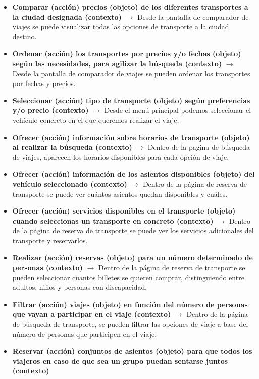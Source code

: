 \begin{itemize}
      \item \textbf{Comparar (acción) precios (objeto) de los diferentes transportes a la ciudad designada (contexto)} $\rightarrow$ Desde la pantalla de comparador
            de viajes se puede visualizar todas las opciones de transporte a la ciudad destino.
      \item \textbf{Ordenar (acción) los transportes por precios y/o fechas (objeto) según las necesidades, para agilizar la búsqueda (contexto)} $\rightarrow$ Desde
            la pantalla de comparador de viajes se pueden ordenar los transportes por fechas y precios.
      \item \textbf{Seleccionar (acción) tipo de transporte (objeto) según preferencias y/o precio (contexto)} $\rightarrow$ Desde el menú principal podemos seleccionar
            el vehículo concreto en el que queremos realizar el viaje.
      \item \textbf{Ofrecer (acción) información sobre horarios de transporte (objeto) al realizar la búsqueda (contexto)} $\rightarrow$ Dentro de la pagina de búsqueda
            de viajes, aparecen los horarios disponibles para cada opción de viaje.
      \item \textbf{Ofrecer (acción) información de los asientos disponibles (objeto) del vehículo seleccionado (contexto)} $\rightarrow$ Dentro de la página de reserva
            de transporte se puede ver cuántos asientos quedan disponibles y cuáles.
      \item \textbf{Ofrecer (acción) servicios disponibles en el transporte (objeto) cuando seleccionas un transporte en concreto (contexto)} $\rightarrow$ Dentro de la
            página de reserva de transporte se puede ver los servicios adicionales del transporte y reservarlos.
      \item \textbf{Realizar (acción) reservas (objeto) para un número determinado de personas (contexto)} $\rightarrow$ Dentro de la página de reserva de transporte
            se pueden seleccionar cuantos billetes se quieren comprar, distinguiendo entre adultos, niños y personas con discapacidad.
      \item \textbf{Filtrar (acción) viajes (objeto) en función del número de personas que vayan a participar en el viaje (contexto)} $\rightarrow$ Dentro de la página
            de búsqueda de transporte, se pueden filtrar las opciones de viaje a base del número de personas que participen en el viaje.
      \item \textbf{Reservar (acción) conjuntos de asientos (objeto) para que todos los viajeros en caso de que sea un grupo puedan sentarse juntos (contexto)}

\end{itemize}
